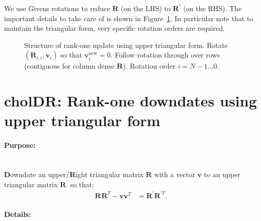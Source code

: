 \documentclass[oneside,english]{scrbook}
\begin{document}
We use Givens rotations to reduce $\bm{R}$ (on the LHS) to
$\bm{R}^{'}$ (on the RHS). The important details to take care of is
shown in Figure~\ref{fig:UDR}. In particular note that to maintain the
triangular form, very specific rotation orders are required.

\begin{figure}[h]
  \begin{center}
    \caption{Structure of rank-one update using upper triangular
      form. Rotate $(\bm{R}_{i,i},\bm{v}_i)$ so that
      $\bm{v}_i^{\text{new}}=0$. Follow rotation through over rows
      (contiguous for column dense $\bm{R}$). Rotation order $i = N-1
      \ldots 0$.} \label{fig:UDR}
  \end{center}
\end{figure}

\section{cholDR: Rank-one downdates using upper triangular form}

\paragraph{Purpose:}~\\
\textbf{D}owndate an upper/\textbf{R}ight triangular matrix
$\bm{R}$ with a vector $\bm{v}$ to an upper triangular matrix
$\bm{R}^{'}$ so that:
\begin{align*}
    \bm{R}^{}\bm{R}^{T}-\bm{v}\bm{v}^T
    &=
    \bm{R}^{'}\bm{R}^{'T}.
\end{align*}

\paragraph{Details:}~\\
\end{document}
